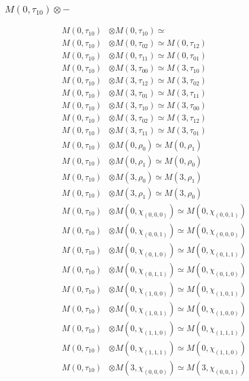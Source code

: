 \subsubsection{$ M(0,\tau_{10})\otimes -$}
\begin{align*}
M(0,\tau_{10}) &\otimes M(0,\tau_{10}) \simeq  \\
M(0,\tau_{10}) &\otimes M(0,\tau_{02}) \simeq M(0,\tau_{12}) \\
M(0,\tau_{10}) &\otimes M(0,\tau_{11}) \simeq M(0,\tau_{01}) \\
M(0,\tau_{10}) &\otimes M(3,\tau_{00}) \simeq M(3,\tau_{10}) \\
M(0,\tau_{10}) &\otimes M(3,\tau_{12}) \simeq M(3,\tau_{02}) \\
M(0,\tau_{10}) &\otimes M(3,\tau_{01}) \simeq M(3,\tau_{11}) \\
M(0,\tau_{10}) &\otimes M(3,\tau_{10}) \simeq M(3,\tau_{00}) \\
M(0,\tau_{10}) &\otimes M(3,\tau_{02}) \simeq M(3,\tau_{12}) \\
M(0,\tau_{10}) &\otimes M(3,\tau_{11}) \simeq M(3,\tau_{01}) \\
M(0,\tau_{10}) &\otimes M(0,\rho_{0}) \simeq M(0,\rho_{1}) \\
M(0,\tau_{10}) &\otimes M(0,\rho_{1}) \simeq M(0,\rho_{0}) \\
M(0,\tau_{10}) &\otimes M(3,\rho_{0}) \simeq M(3,\rho_{1}) \\
M(0,\tau_{10}) &\otimes M(3,\rho_{1}) \simeq M(3,\rho_{0}) \\
M(0,\tau_{10}) &\otimes M(0,\chi_{(0,0,0)}) \simeq M(0,\chi_{(0,0,1)}) \\
M(0,\tau_{10}) &\otimes M(0,\chi_{(0,0,1)}) \simeq M(0,\chi_{(0,0,0)}) \\
M(0,\tau_{10}) &\otimes M(0,\chi_{(0,1,0)}) \simeq M(0,\chi_{(0,1,1)}) \\
M(0,\tau_{10}) &\otimes M(0,\chi_{(0,1,1)}) \simeq M(0,\chi_{(0,1,0)}) \\
M(0,\tau_{10}) &\otimes M(0,\chi_{(1,0,0)}) \simeq M(0,\chi_{(1,0,1)}) \\
M(0,\tau_{10}) &\otimes M(0,\chi_{(1,0,1)}) \simeq M(0,\chi_{(1,0,0)}) \\
M(0,\tau_{10}) &\otimes M(0,\chi_{(1,1,0)}) \simeq M(0,\chi_{(1,1,1)}) \\
M(0,\tau_{10}) &\otimes M(0,\chi_{(1,1,1)}) \simeq M(0,\chi_{(1,1,0)}) \\
M(0,\tau_{10}) &\otimes M(3,\chi_{(0,0,0)}) \simeq M(3,\chi_{(0,0,1)}) \\

\end{align*}
